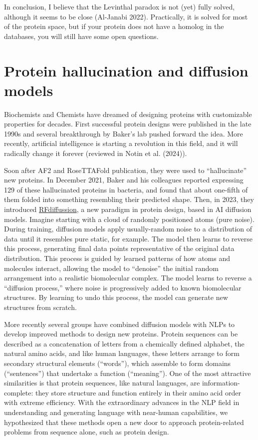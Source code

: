 \documentclass[
]{scrbook}
\begin{document}
In conclusion, I believe that the Levinthal paradox is not (yet) fully
solved, although it seems to be close (Al-Janabi 2022). Practically, it
is solved for most of the protein space, but if your protein does not
have a homolog in the databases, you will still have some open
questions.

\chapter{Protein hallucination and diffusion
models}\label{protein-hallucination-and-diffusion-models}

Biochemists and Chemists have dreamed of designing proteins with
customizable properties for decades. First successful protein designs
were published in the late 1990s and several breakthrough by Baker's lab
pushed forward the idea. More recently, artificial intelligence is
starting a revolution in this field, and it will radically change it
forever (reviewed in Notin et al. (2024)).

Soon after AF2 and RoseTTAFold publication, they were used to
``hallucinate'' new proteins. In December 2021, Baker and his colleagues
reported expressing 129 of these hallucinated proteins in bacteria, and
found that about one-fifth of them folded into something resembling
their predicted shape. Then, in 2023, they introduced
\href{https://www.bakerlab.org/2023/03/30/rf-diffusion-now-free-and-open-source/}{RFdiffussion},
a new paradigm in protein design, based in AI diffusion models. Imagine
starting with a cloud of randomly positioned atoms (pure noise). During
training, diffusion models apply usually-random noise to a distribution
of data until it resembles pure static, for example. The model then
learns to reverse this process, generating final data points
representative of the original data distribution. This process is guided
by learned patterns of how atoms and molecules interact, allowing the
model to ``denoise'' the initial random arrangement into a realistic
biomolecular complex. The model learns to reverse a ``diffusion
process,'' where noise is progressively added to known biomolecular
structures. By learning to undo this process, the model can generate new
structures from scratch.

More recently several groups have combined diffusion models with NLPs to
develop improved methods to design new proteins. Protein sequences can
be described as a concatenation of letters from a chemically defined
alphabet, the natural amino acids, and like human languages, these
letters arrange to form secondary structural elements (``words''), which
assemble to form domains (``sentences'') that undertake a function
(``meaning''). One of the most attractive similarities is that protein
sequences, like natural languages, are information-complete: they store
structure and function entirely in their amino acid order with extreme
efficiency. With the extraordinary advances in the NLP field in
understanding and generating language with near-human capabilities, we
hypothesized that these methods open a new door to approach
protein-related problems from sequence alone, such as protein design.
\end{document}
